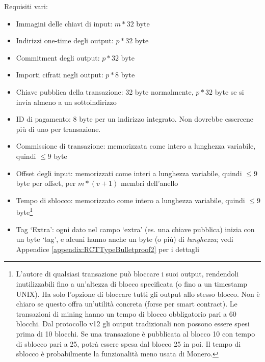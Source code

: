 Requisiti vari:
\begin{itemize}
    \setlength\itemsep{\listspace}
    \item Immagini delle chiavi di input: $m*32$ byte
    \item Indirizzi one-time degli output: $p*32$ byte
    \item Commitment degli output: $p*32$ byte
    \item Importi cifrati negli output: $p*8$ byte
    \item Chiave pubblica della transazione: 32 byte normalmente, $p*32$ byte se si invia almeno a un sottoindirizzo
    \item ID di pagamento: 8 byte per un indirizzo integrato. Non dovrebbe essercene più di uno per transazione.
    \item Commissione di transazione: memorizzata come intero a lunghezza variabile, quindi $\leq 9$ byte
    \item Offset degli input: memorizzati come interi a lunghezza variabile, quindi $\leq 9$ byte per offset, per $m*(v+1)$ membri dell’anello
    \item Tempo di sblocco: memorizzato come intero a lunghezza variabile, quindi $\leq 9$ byte\footnote{L'autore di qualsiasi transazione può bloccare i suoi output, rendendoli inutilizzabili fino a un’altezza di blocco specificata (o fino a un timestamp UNIX). Ha solo l’opzione di bloccare tutti gli output allo stesso blocco. Non è chiaro se questo offra un’utilità concreta (forse per smart contract). Le transazioni di mining hanno un tempo di blocco obbligatorio pari a 60 blocchi. Dal protocollo v12 gli output tradizionali non possono essere spesi prima di 10 blocchi. Se una transazione è pubblicata al blocco 10 con tempo di sblocco pari a 25, potrà essere spesa dal blocco 25 in poi. Il tempo di sblocco è probabilmente la funzionalità meno usata di Monero.}
    \item Tag `Extra': ogni dato nel campo `extra' (es. una chiave pubblica) inizia con un byte `tag', e alcuni hanno anche un byte (o più) di \emph{lunghezza}; vedi Appendice \ref{appendix:RCTTypeBulletproof2} per i dettagli
\end{itemize}